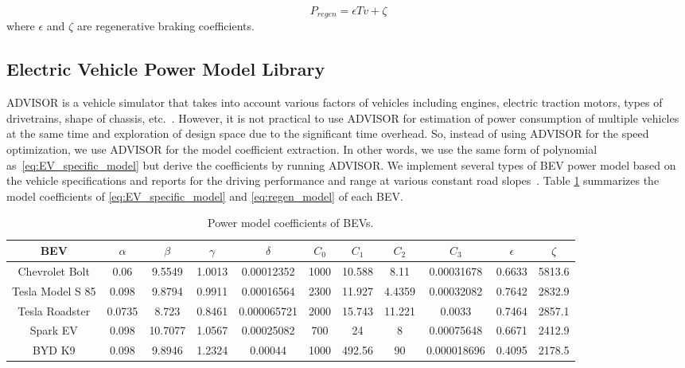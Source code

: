 \documentclass{IEEEtran}
\begin{document}
\begin{equation}\label{eq:regen_model} 
P_{regen} = \epsilon T v + \zeta
\end{equation}  %
where $\epsilon$ and $\zeta$ are regenerative braking coefficients.

\subsection{Electric Vehicle Power Model Library}

ADVISOR is a vehicle simulator that takes into account various factors of vehicles including engines, electric traction motors, types of drivetrains, shape of chassis, etc.~\cite{Markel:JPS02}. 
However, it is not practical to use ADVISOR for estimation of power consumption of multiple vehicles at the same time and exploration of design space due to the significant time overhead. 
So, instead of using ADVISOR for the speed optimization, we use ADVISOR for the model coefficient extraction. 
In other words, we use the same form of polynomial as~\eqref{eq:EV_specific_model} but derive the coefficients by running ADVISOR.
We implement several types of BEV power model based on the vehicle specifications and reports for the driving performance and range at various constant road slopes~\cite{GM_Bolt:official,Tesla_ModelS:official,GM_Spark:official,BYD_K9:official,Tesla_Roadster:official}. 
Table \ref{table:Coeff_EVs} summarizes the model coefficients of \eqref{eq:EV_specific_model} and \eqref{eq:regen_model} of each BEV. 

\begin{table} 	%
\centering
\small
\caption{Power model coefficients of BEVs.}
\label{table:Coeff_EVs}
\begin{tabular}{|c|c|c|c|c|c|c|c|c|c|c|} \hline

BEV 		 	&$\alpha$	&$\beta$	&$\gamma$	&$\delta$		&$C_0$	&$C_1$	&$C_2$	&$C_3$		&$\epsilon$	&$\zeta$ \\ \hline

Chevrolet Bolt	&0.06	&9.5549	&1.0013		&0.00012352	&1000	&10.588	&8.11	&0.00031678	&0.6633		&5813.6 \\ \hline

Tesla Model S 85 &0.098	&9.8794	&0.9911		&0.00016564	&2300	&11.927	&4.4359	&0.00032082	& 0.7642		&2832.9 \\ \hline

Tesla Roadster	&0.0735	&8.723	&0.8461		&0.000065721	&2000	&15.743	&11.221	&0.0033		&0.7464		&2857.1 \\ \hline

Spark EV		&0.098	&10.7077	&1.0567		&0.00025082	&700		&24		&8	&0.00075648	&0.6671		&2412.9 \\ \hline

BYD K9		&0.098	&9.8946	&1.2324		&0.00044		&1000	&492.56	&90	&0.000018696	&0.4095		&2178.5 \\ \hline

\end{tabular}
\end{table}
\end{document}
